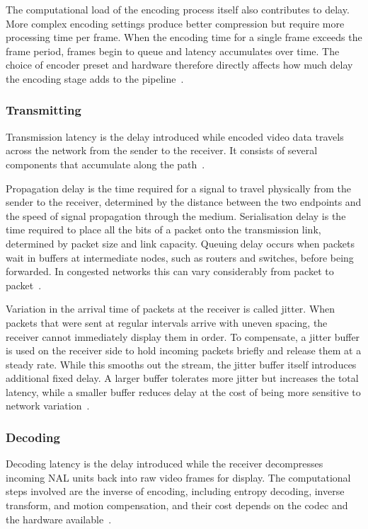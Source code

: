 The computational load of the encoding process itself also contributes to delay. More complex encoding settings produce better compression but require more processing time per frame. When the encoding time for a single frame exceeds the frame period, frames begin to queue and latency accumulates over time. The choice of encoder preset and hardware therefore directly affects how much delay the encoding stage adds to the pipeline~\cite{axis2024}.

 
\subsubsection{Transmitting}\label{subsec:transmitting}
Transmission latency is the delay introduced while encoded video data travels across the network from the sender to the receiver. It consists of several components that accumulate along the path~\cite{forouzan2012}.
 
Propagation delay is the time required for a signal to travel physically from the sender to the receiver, determined by the distance between the two endpoints and the speed of signal propagation through the medium. Serialisation delay is the time required to place all the bits of a packet onto the transmission link, determined by packet size and link capacity. Queuing delay occurs when packets wait in buffers at intermediate nodes, such as routers and switches, before being forwarded. In congested networks this can vary considerably from packet to packet~\cite{forouzan2012}.
 
Variation in the arrival time of packets at the receiver is called jitter. When packets that were sent at regular intervals arrive with uneven spacing, the receiver cannot immediately display them in order. To compensate, a jitter buffer is used on the receiver side to hold incoming packets briefly and release them at a steady rate. While this smooths out the stream, the jitter buffer itself introduces additional fixed delay. A larger buffer tolerates more jitter but increases the total latency, while a smaller buffer reduces delay at the cost of being more sensitive to network variation~\cite{axis2024}.

 
\subsubsection{Decoding}\label{subsec:decoding}
Decoding latency is the delay introduced while the receiver decompresses incoming NAL units back into raw video frames for display. The computational steps involved are the inverse of encoding, including entropy decoding, inverse transform, and motion compensation, and their cost depends on the codec and the hardware available~\cite{hamidouche2022}.
 
